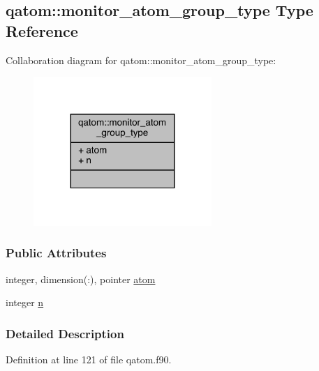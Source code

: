 \hypertarget{structqatom_1_1monitor__atom__group__type}{\subsection{qatom\-:\-:monitor\-\_\-atom\-\_\-group\-\_\-type Type Reference}
\label{structqatom_1_1monitor__atom__group__type}
}


Collaboration diagram for qatom\-:\-:monitor\-\_\-atom\-\_\-group\-\_\-type\-:
\nopagebreak
\begin{figure}[H]
\begin{center}
\leavevmode
\includegraphics[width=191pt]{structqatom_1_1monitor__atom__group__type__coll__graph}
\end{center}
\end{figure}
\subsubsection*{Public Attributes}
\begin{DoxyCompactItemize}
\item 
integer, dimension(\-:), pointer \hyperlink{structqatom_1_1monitor__atom__group__type_a755872019451f3bc41f637aca5737b57}{atom}
\item 
integer \hyperlink{structqatom_1_1monitor__atom__group__type_a8b8da0061a3a668546661669f124251c}{n}
\end{DoxyCompactItemize}


\subsubsection{Detailed Description}


Definition at line 121 of file qatom.\-f90.



